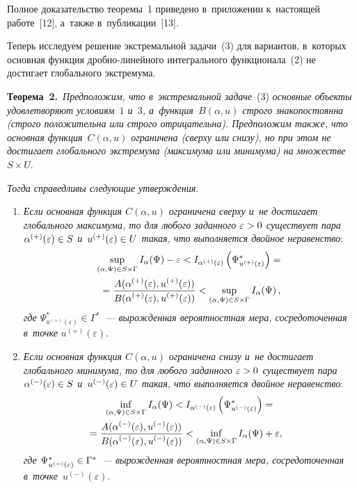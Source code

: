 \begin{multicols}{2}
\smallskip

     Полное доказательство тео\-ре\-мы~1 приведено в~приложении 
к~на\-сто\-ящей работе~[12], а~также в~пуб\-ли\-ка\-ции~[13].
     
     Теперь исследуем решение экстремальной задачи~(3) для вариантов, 
в~которых основная функция  
дроб\-но-ли\-ней\-но\-го интегрального функционала~(2) не достигает 
глобального экстремума.
     
     \smallskip
     
     \noindent
     \textbf{Теорема~2.}\ \textit{Предположим, что в~экстремальной 
задаче}~(3) \textit{основные объекты удовлетворяют условиям~$1$ и~$3$, 
а~функ\-ция~$B(\alpha, u)$ строго знакопостоянна (строго положительна или 
строго отрицательна). Предположим также, что основная функция~$C(\alpha, 
u)$ ограничена (сверху или снизу), но при этом не достигает глобального 
экстремума (максимума или минимума) на множестве}~$S\times U$.
     
     \textit{Тогда справедливы следующие утверж\-де\-ния}.
     \begin{enumerate}[1.]
\item \textit{Если основная функция $C(\alpha, u)$ ограничена сверху и~не 
достигает глобального максимума, то для любого заданного 
$\varepsilon\hm>0$ существует пара $\alpha^{(+)} (\varepsilon)\hm\in S$ 
и~$u^{(+)}(\varepsilon)\hm\in U$ такая, что выполняется двойное неравенство}:
\begin{multline}
\mathop{\mathrm{sup}}\limits_{(\alpha, \Psi)\in S\times \Gamma} I_\alpha(\Psi)-
\varepsilon < I_{\alpha^{(+)}(\varepsilon)}\left( 
\Psi^*_{u^{(+)}(\varepsilon)}\right)={}\\
{}= \displaystyle\frac{\displaystyle A(\alpha^{(+)}(\varepsilon), u^{(+)}(\varepsilon))\mathstrut}{\displaystyle  
B(\alpha^{(+)}(\varepsilon), u^{(+)}(\varepsilon))\mathstrut}<\sup\limits_{(\alpha,\Psi)\in 
S\times \Gamma} I_\alpha (\Psi)\,,
\label{e4-shn}
\end{multline}
\textit{где $\Psi^*_{u^{(+)}(\varepsilon)}\in \Gamma^*$~--- вы\-рож\-ден\-ная 
вероятностная мера, сосредоточенная в~точке} $u^{(+)}(\varepsilon)$.
\item \textit{Если основная функция $C(\alpha, u)$ ограничена снизу и~не 
достигает глобального минимума, то для любого заданного $\varepsilon \hm >0$ 
существует пара $\alpha^{(-)} (\varepsilon)\hm\in S$ и~$u^{(-)}
(\varepsilon)\hm\in U$ такая, что выполняется двойное неравенство}:
\begin{multline}
\mathop{\mathrm{inf}}\limits_{(\alpha,\Psi)\in S\times \Gamma} I_\alpha(\Psi)< 
I_{\alpha^{(-)}(\varepsilon)} \left( \Psi^*_{u^{(-)}(\varepsilon)}\right)={}\\
\hspace*{-5mm}{}= \fr{A(\alpha^{(-)}(\varepsilon), u^{(-)}(\varepsilon))}{ B(\alpha^{(-)}
(\varepsilon), u^{(-)}(\varepsilon))} <\mathop{\mathrm{inf}}\limits_{(\alpha,\Psi)\in 
S\times\Gamma} I_\alpha(\Psi)+\varepsilon,\!
\label{e5-shn}
\end{multline}
\textit{где $\Psi^*_{u^{(-)}(\varepsilon)}\hm\in \Gamma^*$~--- 
вы\-рож\-ден\-ная вероятностная мера, со\-сре\-до\-то\-чен\-ная в~точке}~$u^{(-)}
(\varepsilon)$.
     \end{enumerate}
     

\end{multicols}
